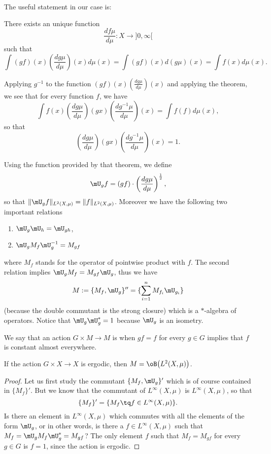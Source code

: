 The useful statement in our case is:
\begin{proposition}
	There exists an unique function
	\[
		\frac{ d f\mu }{ d \mu }\colon X\to ]0,\infty[
	\]
	such that
	\begin{equation}	\label{EqDefRadonNiko}
		\int (gf)(x)\left( \frac{ d g\mu }{ d \mu } \right)(x)d\mu(x)=\int (gf)(x)d(g\mu)(x)=\int f(x)d\mu(x).
	\end{equation}
\end{proposition}
Applying $g^{-1}$ to the function $(gf)(x)\left( \frac{ d g\mu }{ d \mu } \right)(x)$ and applying the theorem, we see that for every function $f$, we have
\[
	\int f(x)\left( \frac{ d g\mu }{ d \mu } \right)(gx)\left( \frac{ d g^{-1}\mu }{ d \mu } \right)(x)=\int f(f)d\mu(x),
\]
so that
\begin{equation}
	\left( \frac{ d g\mu }{ d \mu } \right)(gx)\left( \frac{ d g^{-1}\mu }{ d \mu } \right)(x)=1.
\end{equation}

Using the function provided by that theorem, we define
\begin{equation}
	\mU_gf=(gf)\cdot\left( \frac{ d g\mu }{ d \mu } \right)^{\frac{ 1 }{2}},
\end{equation}
so that $\| \mU_gf \|_{ L^2(X,\mu)}=\| f \|_{ L^2(X,\mu)}$. Moreover we have the following two important relations
\begin{enumerate}
	\item $\mU_g\mU_h=\mU_{gh}$,
	\item $\mU_g M_f \mU_g^{-1}=M_{gf}$
\end{enumerate}
where $M_f$ stands for the operator of pointwise product with $f$. The second relation implies $\mU_g M_f=M_{gf}\mU_g$, thus we have
\begin{equation}
	M:=\{ M_f,\mU_g \}''=\{ \sum_{i=1}^n M_{f_i}\mU_{g_i} \}
\end{equation}
(because the double commutant is the strong closure) which is a $*$-algebra of operators. Notice that $\mU_g\mU_g^*=1$ because $\mU_g$ is an isometry.

We say that an action $G\times M\to M$ is  when $gf=f$ for every $g\in G$ implies that $f$ is constant almost everywhere.

\begin{lemma}		\label{LemergoBLCmu}
	If the action $G\times X\to X$ is ergodic, then $M=\oB\big(  L^2(X,\mu) \big)$.
\end{lemma}

\begin{proof}
	Let us first study the commutant $\{ M_f,\mU_g \}'$ which is of course contained in $\{ M_f \}'$. But we know that the commutant of $ L^{\infty}(X,\mu)$ is $ L^{\infty}(X,\mu)$, so that
	\[
		\{ M_f \}'=\{ M_f\tq f\in L^{\infty}(X,\mu) \}.
	\]
	Is there an element in $ L^{\infty}(X,\mu)$ which commutes with all the elements of the form $\mU_g$, or in other words, is there a $f\in  L^{\infty}(X,\mu)$ such that $M_f=\mU_g M_f\mU_g^*=M_{gf}$? The only element $f$ such that $M_f=M_{gf}$ for every $g\in G$ is $f=1$, since the action is ergodic.
\end{proof}

